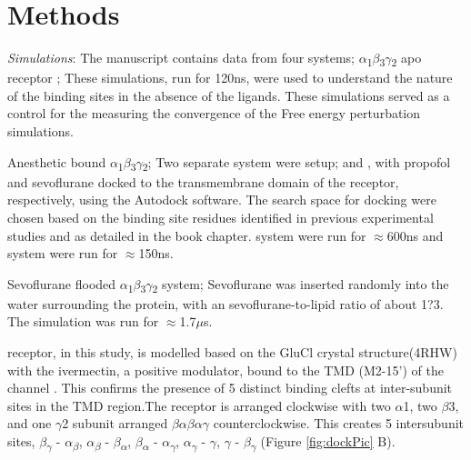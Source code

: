 \documentclass{biophys}
\begin{document}
\section{Methods}


 

\textit{Simulations}: The manuscript contains data from four systems; 
$\alpha$\textsubscript{1}$\beta$\textsubscript{3}$\gamma$\textsubscript{2} apo receptor ; 
These simulations, run for 120ns, were used to understand the nature of the binding sites in the absence of the ligands. These simulations served as a control for the measuring the convergence of the Free energy perturbation simulations.

Anesthetic bound $\alpha$\textsubscript{1}$\beta$\textsubscript{3}$\gamma$\textsubscript{2}; 
Two separate  system were setup; \Ps and  \Ss, with propofol and sevoflurane docked to the transmembrane domain of the receptor, respectively, using the Autodock software\cite{Trott}. The search space for docking were chosen based on the binding site residues identified in previous experimental studies and as detailed in the book chapter\cite{Murlidaran2018}. \Ps system were run for $\approx$600ns and \Ss system were run for $\approx$150ns.

Sevoflurane flooded  $\alpha$\textsubscript{1}$\beta$\textsubscript{3}$\gamma$\textsubscript{2} system;
Sevoflurane was inserted randomly into the water surrounding the protein, with an sevoflurane-to-lipid ratio of about 1?3. The simulation was run for $\approx$1.7$\mu$s.

\GABAA receptor, in this study, is modelled based on the GluCl crystal structure(4RHW) with the ivermectin, a positive modulator, bound to the TMD (M2-15') of the channel \citep{Hibbs2011}. This confirms the presence of 5 distinct binding clefts at inter-subunit sites in the TMD region.The \GABAA receptor is arranged clockwise with two $\alpha$1, two $\beta$3, and one $\gamma$2 subunit arranged $\beta$$\alpha$$\beta$$\alpha$$\gamma$ counterclockwise. This creates 5 intersubunit sites, $\beta$\textsubscript{$\gamma$} - $\alpha$\textsubscript{$\beta$}, $\alpha$\textsubscript{$\beta$} - $\beta$\textsubscript{$\alpha$}, $\beta$\textsubscript{$\alpha$} - $\alpha$\textsubscript{$\gamma$}, $\alpha$\textsubscript{$\gamma$} - $\gamma$,  $\gamma$ - $\beta$\textsubscript{$\gamma$} (Figure \ref{fig:dockPic} B).
\end{document}
